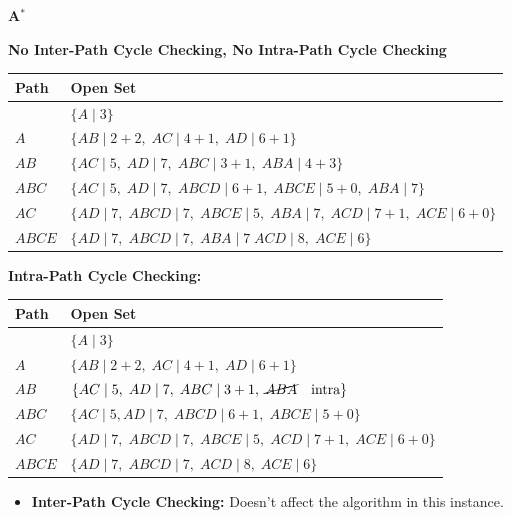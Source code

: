 \begin{example} \textbf{A$^*$}

    \textbf{No Inter-Path Cycle Checking, No Intra-Path Cycle Checking}
    \begin{center}
        \begin{tabular}{ll}
        \toprule
        \textbf{Path} & \textbf{Open Set} \\
        \midrule
         & $\{A \mid 3 \}$ \\
        $A$ & $\{AB \mid 2 + 2, \; AC \mid 4 + 1, \; AD \mid 6 + 1\}$ \\
        $AB$ & $\{AC \mid 5, \; AD \mid 7, \; ABC \mid 3 + 1, \; ABA \mid 4 + 3 \}$ \\
        $ABC$ & $\{AC \mid 5, \; AD \mid 7, \; ABCD \mid 6 + 1, \; ABCE \mid 5 + 0, \; ABA \mid 7 \}$ \\
        $AC$ & $\{AD \mid 7, \; ABCD \mid 7, \; ABCE \mid 5, \; ABA \mid 7, \; ACD \mid 7 + 1, \; ACE \mid 6 + 0\}$ \\
        $ABCE$ & $\{AD \mid 7, \; ABCD \mid 7, \; ABA \mid 7 \; ACD \mid 8, \; ACE \mid 6 \}$ \\
        \bottomrule
        \end{tabular}
    \end{center}
    \vspace{1em}

    \textbf{Intra-Path Cycle Checking:}
    \begin{center}
        \begin{tabular}{ll}
        \toprule
        \textbf{Path} & \textbf{Open Set} \\
        \midrule
         & $\{A \mid 3 \}$ \\
        $A$ & $\{AB \mid 2 + 2, \; AC \mid 4 + 1, \; AD \mid 6 + 1\}$ \\
        $AB$ & $\{AC \mid 5, \; AD \mid 7, \; ABC \mid 3 + 1, \; \cancel{ABA} \quad \text{intra} \}$ \\
        $ABC$ & $\{AC \mid 5, AD \mid 7, \; ABCD \mid 6 + 1, \; ABCE \mid 5 + 0 \}$ \\
        $AC$ & $\{AD \mid 7, \; ABCD \mid 7, \; ABCE \mid 5, \; ACD \mid 7 + 1, \; ACE \mid 6 + 0 \}$ \\
        $ABCE$ & $\{AD \mid 7, \; ABCD \mid 7, \; ACD \mid 8, \; ACE \mid 6 \}$ \\
        \bottomrule
        \end{tabular}
    \end{center}
    \begin{itemize}
        \item \textbf{Inter-Path Cycle Checking:} Doesn't affect the algorithm in this instance.
    \end{itemize}
\end{example}
\newpage

